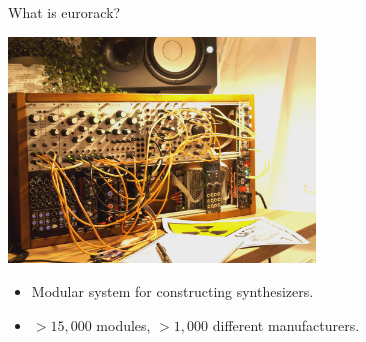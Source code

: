 \documentclass{beamer}
\begin{document}
\begin{frame}{What is eurorack?}



    \begin{center}
        \includegraphics[height=6cm]{img/my_system.png}
    \end{center}

    \begin{itemize}
        \item Modular system for constructing synthesizers.
        \item $>15,000$ modules, $>1,000$ different manufacturers.
    \end{itemize}


\end{frame}
\end{document}

